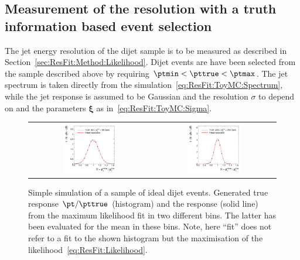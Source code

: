 \subsection{Measurement of the resolution with a truth information based event selection}\label{sec:ResFit:App:ToyMC:PtGenCuts}

The jet energy resolution of the dijet sample is to be measured as described in Section~\ref{sec:ResFit:Method:Likelihood}.
Dijet events are have been selected from the sample described above by
requiring \mbox{$\ptmin < \pttrue < \ptmax$}.
The jet \pt spectrum is taken directly from the
simulation~\eqref{eq:ResFit:ToyMC:Spectrum}, while the jet \pt
response is assumed to be Gaussian and the resolution $\sigma$ to
depend on \pttrue and the parameters $\mathbf{\xi}$ as
in~\eqref{eq:ResFit:ToyMC:Sigma}.

\begin{figure}[ht]
\centering
\begin{tabular}{cc}
  \includegraphics[width=0.45\textwidth]{figures/resFit_ToyMC_PtGenCuts_ResolutionBin1} &
  \includegraphics[width=0.45\textwidth]{figures/resFit_ToyMC_PtGenCuts_ResolutionBin7} \\      
\end{tabular}
\caption{Simple simulation of a sample of ideal dijet events.
  Generated true response \mbox{$\pt / \pttrue$} (histogram) and
  the response (solid line) from the maximum likelihood fit in two
  different \pttrue bins.
  The latter has been evaluated for the mean \pttrue in these bins.
  Note, here ``fit'' does not refer to a fit to the shown histogram but the maximisation of the likelihood~\eqref{eq:ResFit:Likelihood}.
}
\label{fig:ResFit:App:ToyMC:PtGenCuts:Response}
\end{figure}


